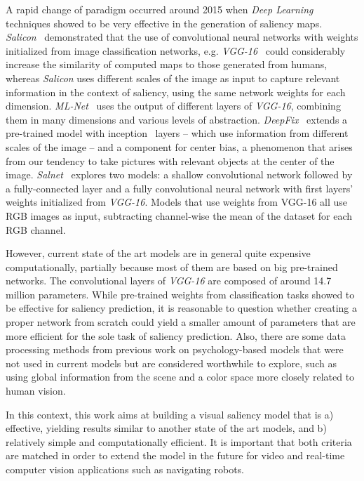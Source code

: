 \documentclass[journal]{IEEEtran}
\begin{document}
A rapid change of paradigm occurred around 2015 when \emph{Deep Learning}
techniques showed to be very effective in the generation of saliency
maps.
\emph{Salicon}~\cite{jiang_2015} demonstrated that the use of
convolutional neural networks with weights initialized from
image classification networks, e.g. \emph{VGG-16}~\cite{zisserman_2014}
could considerably increase the similarity of computed maps to those
generated from humans, whereas \emph{Salicon} uses different scales of the image as input to capture relevant
information in the context of saliency, using the same network weights
for each dimension.
\emph{ML-Net}~\cite{cornia_2016} uses the output of different layers
of \emph{VGG-16}, combining them in many dimensions and various levels of
abstraction.
\emph{DeepFix}~\cite{kruthiventi_2015} extends a pre-trained model with
inception~\cite{szegedy_2014} layers -- which use information from different
scales of the image -- and a component for center bias, a phenomenon that arises from our tendency to take pictures with relevant
objects at the center of the image.
\emph{Salnet}~\cite{pan_2016} explores two models: a shallow convolutional network followed by a fully-connected layer and a fully convolutional
neural network with first layers' weights initialized from \emph{VGG-16}.
Models that use weights from VGG-16 all use RGB images as input, subtracting
channel-wise the mean of the dataset for each RGB channel.

However, current state of the art models are in general quite expensive computationally,
partially because most of them are based on big pre-trained networks.
The convolutional layers of \emph{VGG-16} are composed of around 14.7
million parameters.
While pre-trained weights from classification tasks showed to be effective
for saliency prediction, it is reasonable to question whether
creating a proper network from scratch could yield a smaller amount of
parameters that are more efficient for the sole task of saliency prediction.
Also, there are some data processing methods from previous work on
psychology-based models that were not used in current models but
are considered worthwhile to explore,
such as using global information from the scene and a color space more
closely related to human vision.

In this context, this work aims at building a visual saliency model that is a) effective,
yielding results similar to another state of the art models,
and b) relatively simple and computationally efficient.
It is important that both criteria are matched in order to extend the
model in the future for video and real-time computer vision applications
such as navigating robots.
\end{document}
